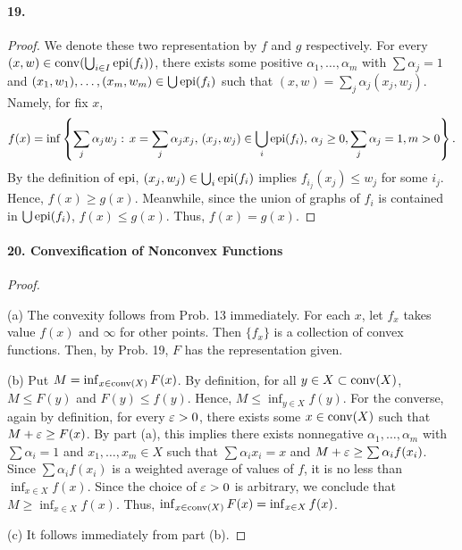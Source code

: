   \paragraph{19.}
  \begin{proof}
    We denote these two representation by $f$ and $g$ respectively. For every
    $(x,w)\in\operatorname{conv}(\bigcup_{i\in I}\operatorname{epi}(f_i))$, there exists some positive 
    $\alpha_1,\dots,\alpha_m$ with $\sum\alpha_j=1$ and $(x_1,w_1),\allowbreak
    \dots,\allowbreak(x_m,w_m)\in\bigcup\operatorname{epi}(f_i)$ such that $(x,w)=\sum_j
    \alpha_j(x_j,w_j)$. Namely, for fix $x$,
    \begin{align*}
      f(x)=\inf\left\{\sum_j\alpha_jw_j:\,x=\sum_j\alpha_jx_j,\,
      (x_j,w_j)\in\bigcup_{i}\operatorname{epi}(f_i),\,
      \alpha_j\ge 0,\sum_j\alpha_j=1,m>0\right\}.
    \end{align*}
    By the definition of $\operatorname{epi}$, $(x_j,w_j)\in\bigcup_i\operatorname{epi}(f_i)$ implies 
    $f_{i_j}(x_j)\le w_j$ for some $i_j$. Hence, $f(x)\ge g(x)$. Meanwhile,
    since the union of graphs of $f_i$ is contained in $\bigcup\operatorname{epi}(f_i)$, 
    $f(x)\le g(x)$. Thus, $f(x)=g(x)$.
  \end{proof}
  
  \paragraph{20. Convexification of Nonconvex Functions}
  \begin{proof}
    $\,$\par
    (a) The convexity follows from Prob. 13 immediately. For each $x$, let 
    $f_x$ takes value $f(x)$ and $\infty$ for other points. Then $\{f_x\}$ is 
    a collection of convex functions. Then, by Prob. 19, $F$ has the 
    representation given.\par
    (b) Put $M=\inf_{x\in\operatorname{conv}(X)}F(x)$. By definition, for all $y\in X\subset
    \operatorname{conv}(X)$, $M\le F(y)$ and $F(y)\le f(y)$. Hence, $M\le\inf_{y\in X}f(y)$. 
    For the converse, again by definition, for every $\varepsilon>0$, there exists
    some $x\in\operatorname{conv}(X)$ such that $M+\varepsilon\ge F(x)$. By part (a), this implies
    there exists nonnegative $\alpha_1,\dots,\alpha_m$ with $\sum\alpha_i=1$
    and $x_1,\dots,x_m\in X$ such that $\sum\alpha_ix_i=x$ and $M+\varepsilon\ge 
    \sum\alpha_if(x_i)$. Since $\sum\alpha_if(x_i)$ is a weighted average of 
    values of $f$, it is no less than $\inf_{x\in X}f(x)$. Since the choice of
    $\varepsilon>0$ is arbitrary, we conclude that $M\ge\inf_{x\in X}f(x)$. Thus,
    $\inf_{x\in\operatorname{conv}(X)}F(x)=\inf_{x\in X}f(x)$.\par
    (c) It follows immediately from part (b).
  \end{proof}
  
